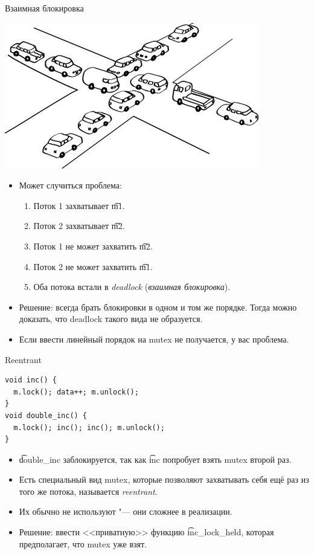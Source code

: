 \begin{frame}{Взаимная блокировка}
	\begin{center}
		\includegraphics{deadlock.jpg}
	\end{center}
	\begin{itemize}
		\item
			Может случиться проблема:
			\begin{enumerate}
				\item Поток 1 захватывает \t{m1}.
				\item Поток 2 захватывает \t{m2}.
				\item Поток 1 не может захватить \t{m2}.
				\item Поток 2 не может захватить \t{m1}.
				\item Оба потока встали в \textit{deadlock} (\textit{взаимная блокировка}).
			\end{enumerate}
		\item
			Решение: всегда брать блокировки в одном и том же порядке.
			Тогда можно доказать, что deadlock такого вида не образуется.
		\item
			Если ввести линейный порядок на mutex не получается, у вас проблема.
	\end{itemize}
\end{frame}

\begin{frame}[fragile]{Reentrant}
\begin{verbatim}
void inc() {
  m.lock(); data++; m.unlock();
}
void double_inc() {
  m.lock(); inc(); inc(); m.unlock();
}
\end{verbatim}
	\begin{itemize}
		\item \t{double\_inc} заблокируется, так как \t{inc} попробует взять mutex второй раз.
		\item Есть специальный вид mutex, которые позволяют захватывать себя ещё раз из того же потока, называется \textit{reentrant}.
		\item Их обычно не используют "--- они сложнее в реализации.
		\item
			Решение: ввести <<приватную>> функцию \t{inc\_lock\_held}, которая предполагает,
			что mutex уже взят.
	\end{itemize}
\end{frame}

